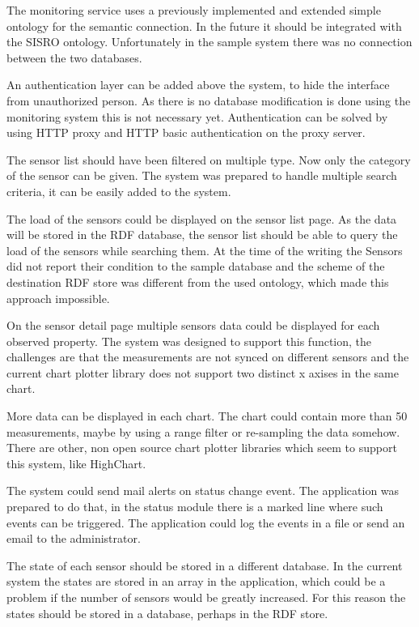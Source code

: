 The monitoring service uses a previously implemented and extended simple ontology for the semantic connection. In the future it should be integrated with the SISRO ontology. Unfortunately in the sample system there was no connection between the two databases.

An authentication layer can be added above the system, to hide the interface from unauthorized person. As there is no database modification is done using the monitoring system this is not necessary yet. Authentication can be solved by using HTTP proxy and HTTP basic authentication on the proxy server.

The sensor list should have been filtered on multiple type. Now only the category of the sensor can be given. The system was prepared to handle multiple search criteria, it can be easily added to the system.

The load of the sensors could be displayed on the sensor list page. As the data will be stored in the RDF database, the sensor list should be able to query the load of the sensors while searching them. At the time of the writing the Sensors did not report their condition to the sample database and the scheme of the destination RDF store was different from the used ontology, which made this approach impossible.

On the sensor detail page multiple sensors data could be displayed for each observed property. The system was designed to support this function, the challenges are that the measurements are not synced on different sensors and the current chart plotter library does not support two distinct x axises in the same chart. 

More data can be displayed in each chart. The chart could contain more than 50 measurements, maybe by using a range filter or re-sampling the data somehow. There are other, non open source chart plotter libraries which seem to support this system, like HighChart.

The system could send mail alerts on status change event. The application was prepared to do that, in the status module there is a marked line where such events can be triggered. The application could log the events in a file or send an email to the administrator.

The state of each sensor should be stored in a different database. In the current system the states are stored in an array in the application, which could be a problem if the number of sensors would be greatly increased. For this reason the states should be stored in a database, perhaps in the RDF store.

